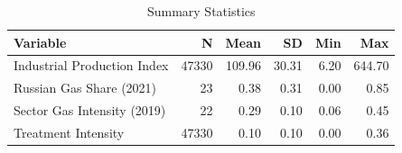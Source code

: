\begin{table}[!h]
\centering
\caption{\label{tab:tab:sumstats}Summary Statistics}
\centering
\begin{tabular}[t]{lrrrrr}
\toprule
Variable & N & Mean & SD & Min & Max\\
\midrule
Industrial Production Index & 47330 & 109.96 & 30.31 & 6.20 & 644.70\\
Russian Gas Share (2021) & 23 & 0.38 & 0.31 & 0.00 & 0.85\\
Sector Gas Intensity (2019) & 22 & 0.29 & 0.10 & 0.06 & 0.45\\
Treatment Intensity & 47330 & 0.10 & 0.10 & 0.00 & 0.36\\
\bottomrule
\end{tabular}
\end{table}
